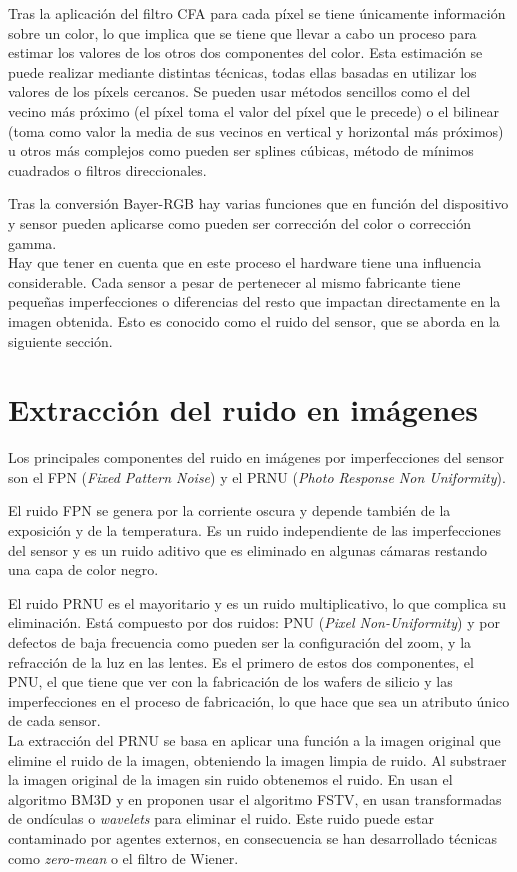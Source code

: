 Tras la aplicación del filtro CFA para cada píxel se tiene únicamente información sobre un color, lo que implica que se tiene que llevar a cabo un proceso para estimar los valores de los otros dos componentes del color. Esta estimación se puede realizar mediante distintas técnicas, todas ellas basadas en utilizar los valores de los píxels cercanos. Se pueden usar métodos sencillos como el del vecino más próximo (el píxel toma el valor del píxel que le precede) o el bilinear (toma como valor la media de sus vecinos en vertical y horizontal más próximos) u otros más complejos como pueden ser splines cúbicas, método de mínimos cuadrados o filtros direccionales\cite{b2:2005}.

Tras la conversión Bayer-RGB hay varias funciones que en función del dispositivo y sensor pueden aplicarse como pueden ser corrección del color o corrección gamma. \\

Hay que tener en cuenta que en este proceso el hardware tiene una influencia considerable. Cada sensor a pesar de pertenecer al mismo fabricante tiene peque\~nas imperfecciones o diferencias del resto que impactan directamente en la imagen obtenida. Esto es conocido como el ruido del sensor, que se aborda en la siguiente sección.

\section{Extracción del ruido en imágenes}
Los principales componentes del ruido en imágenes por imperfecciones del sensor son el FPN (\textit{Fixed Pattern Noise}) y el PRNU (\textit{Photo Response Non Uniformity}).

El ruido FPN se genera por la corriente oscura y depende también de la exposición y de la temperatura. Es un ruido independiente de las imperfecciones del sensor y es un ruido aditivo que es eliminado en algunas cámaras restando una capa de color negro.

El ruido PRNU es el mayoritario y es un ruido multiplicativo, lo que complica su eliminación. Está compuesto por dos ruidos: PNU (\textit{Pixel Non-Uniformity}) y por defectos de baja frecuencia como pueden ser la configuración del zoom, y la refracción de la luz en las lentes. Es el primero de estos dos componentes, el PNU, el que tiene que ver con la fabricación de los wafers de silicio y las imperfecciones en el proceso de fabricación, lo que hace que sea un atributo único de cada sensor. \\

La extracción del PRNU se basa en aplicar una función a la imagen original que elimine el ruido de la imagen, obteniendo la imagen limpia de ruido. Al substraer la imagen original de la imagen sin ruido obtenemos el ruido. En \cite{dabov:2007} usan el algoritmo BM3D y en \cite{gisolf:2013} proponen usar el algoritmo FSTV, en \cite{goljan:2006} usan transformadas de ondículas o \textit{wavelets} para eliminar el ruido. Este ruido puede estar contaminado por agentes externos, en consecuencia se han desarrollado técnicas como \textit{zero-mean}\cite{goljan:2008} o el filtro de Wiener\cite{wiki:wiener}.

